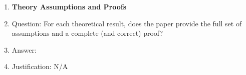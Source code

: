 \begin{enumerate}
\item {\bf Theory Assumptions and Proofs}
    \item[] Question: For each theoretical result, does the paper provide the full set of assumptions and a complete (and correct) proof?
    \item[] Answer: \answerNA{} %
    \item[] Justification: N/A


\end{enumerate}
